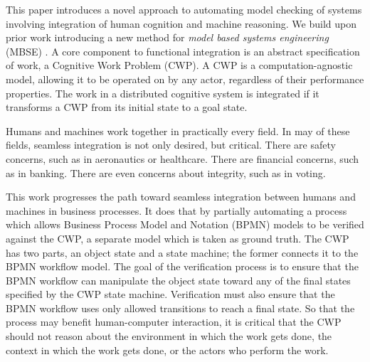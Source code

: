 This paper introduces a novel approach to automating model checking of systems involving integration of human cognition and machine reasoning. We build upon prior work \cite{mercer22} introducing a new method for \emph{model based systems engineering} (MBSE) . A core component to functional integration is an abstract specification of work, a Cognitive Work Problem (CWP). A CWP is a computation-agnostic model, allowing it to be operated on by any actor, regardless of their performance properties. The work in a distributed cognitive system is integrated if it transforms a CWP from its initial state to a goal state.

Humans and machines work together in practically every field. In may of these fields, seamless integration is not only desired, but critical. There are safety concerns, such as in aeronautics\cite{aeronautics1, aeronautics2} or healthcare\cite{healthcare1, healthcare2}. There are financial concerns, such as in banking\cite{banking1,banking2}. There are even concerns about integrity, such as in voting\cite{voting1, voting2}.

This work progresses the path toward seamless integration between humans and machines in business processes. It does that by partially automating a process which allows Business Process Model and Notation (BPMN)\cite{BPMN} models to be verified against the CWP, a separate model which is taken as ground truth. The CWP has two parts, an object state and a state machine; the former connects it to the BPMN workflow model. The goal of the verification process is to ensure that the BPMN workflow can manipulate the object state toward any of the final states specified by the CWP state machine. Verification must also ensure that the BPMN workflow uses only allowed transitions to reach a final state. So that the process may benefit human-computer interaction, it is critical that the CWP should not reason about the environment in which the work gets done, the context in which the work gets done, or the actors who perform the work.

